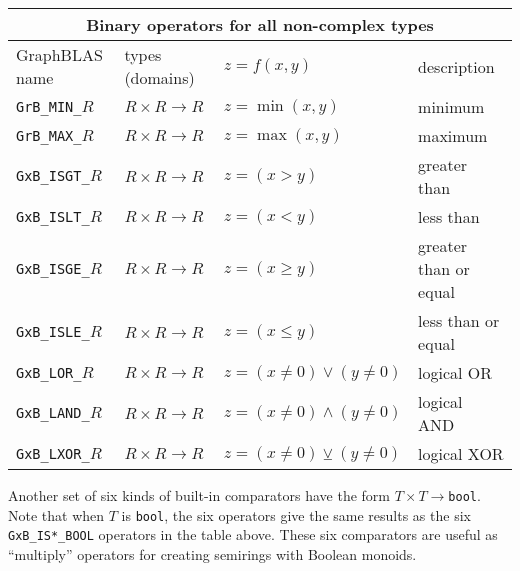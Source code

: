 \documentclass[12pt]{article}
\begin{document}
\vspace{0.2in}
{\footnotesize
\begin{tabular}{|llll|}
\hline
\multicolumn{4}{|c|}{Binary operators for all non-complex types} \\
\hline
GraphBLAS name        & types (domains)            & $z=f(x,y)$      & description \\
\hline
\verb'GrB_MIN_'$R$    & $R \times R \rightarrow R$ & $z = \min(x,y)$ & minimum \\
\verb'GrB_MAX_'$R$    & $R \times R \rightarrow R$ & $z = \max(x,y)$ & maximum \\
\hline
\verb'GxB_ISGT_'$R$   & $R \times R \rightarrow R$ & $z = (x >   y)$ & greater than \\
\verb'GxB_ISLT_'$R$   & $R \times R \rightarrow R$ & $z = (x <   y)$ & less than  \\
\verb'GxB_ISGE_'$R$   & $R \times R \rightarrow R$ & $z = (x \ge y)$ & greater than or equal \\
\verb'GxB_ISLE_'$R$   & $R \times R \rightarrow R$ & $z = (x \le y)$ & less than or equal  \\
\hline
\verb'GxB_LOR_'$R$    & $R \times R \rightarrow R$ & $z = (x \ne 0) \vee    (y \ne 0) $ & logical OR \\
\verb'GxB_LAND_'$R$   & $R \times R \rightarrow R$ & $z = (x \ne 0) \wedge  (y \ne 0) $ & logical AND \\
\verb'GxB_LXOR_'$R$   & $R \times R \rightarrow R$ & $z = (x \ne 0) \veebar (y \ne 0) $ & logical XOR \\
\hline
\end{tabular}
}
\vspace{0.2in}

Another set of six kinds of built-in comparators have the form $T
\times T \rightarrow $\verb'bool'.  Note that when $T$ is \verb'bool', the six
operators give the same results as the six \verb'GxB_IS*_BOOL' operators in the
table above.  These six comparators are useful as ``multiply''
operators for creating semirings with Boolean monoids.
\end{document}
